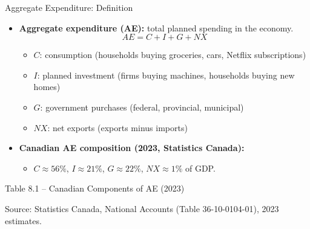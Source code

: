 \documentclass[aspectratio=169]{beamer}
\begin{document}
\begin{frame}{Aggregate Expenditure: Definition}
\transfade
\begin{itemize}
  \item \textbf{Aggregate expenditure (AE):} total planned spending in the economy.
  \[
    AE = C + I + G + NX
  \]
  \begin{itemize}
    \item $C$: consumption (households buying groceries, cars, Netflix subscriptions)
    \item $I$: planned investment (firms buying machines, households buying new homes)
    \item $G$: government purchases (federal, provincial, municipal)
    \item $NX$: net exports (exports minus imports)
  \end{itemize}
  \item \textbf{Canadian AE composition (2023, Statistics Canada):}
  \begin{itemize}
    \item $C \approx 56\%$, $I \approx 21\%$, $G \approx 22\%$, $NX \approx 1\%$ of GDP.
  \end{itemize}
\end{itemize}
\end{frame}

\begin{frame}{Table 8.1 -- Canadian Components of AE (2023)}
\begin{center}
\end{center}
{\tiny Source: Statistics Canada, National Accounts (Table 36-10-0104-01), 2023 estimates.}
\end{frame}
\end{document}
